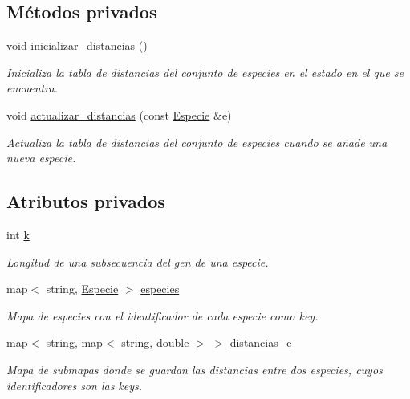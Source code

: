 \subsection*{Métodos privados}
\begin{DoxyCompactItemize}
\item 
void \hyperlink{class_cjt___especies_a8c711f5a2b07eca652b6086c28e999bc}{inicializar\+\_\+distancias} ()
\begin{DoxyCompactList}\small\item\em Inicializa la tabla de distancias del conjunto de especies en el estado en el que se encuentra. \end{DoxyCompactList}\item 
void \hyperlink{class_cjt___especies_a74dc0d7118d70ee6e24e7dd84d49e688}{actualizar\+\_\+distancias} (const \hyperlink{class_especie}{Especie} \&e)
\begin{DoxyCompactList}\small\item\em Actualiza la tabla de distancias del conjunto de especies cuando se añade una nueva especie. \end{DoxyCompactList}\end{DoxyCompactItemize}
\subsection*{Atributos privados}
\begin{DoxyCompactItemize}
\item 
int \hyperlink{class_cjt___especies_a4586fb4724b7af4b7f00bb0c0bdd6a17}{k}
\begin{DoxyCompactList}\small\item\em Longitud de una subsecuencia del gen de una especie. \end{DoxyCompactList}\item 
map$<$ string, \hyperlink{class_especie}{Especie} $>$ \hyperlink{class_cjt___especies_a8f319699bd2e8a42b85ec47b67c17563}{especies}
\begin{DoxyCompactList}\small\item\em Mapa de especies con el identificador de cada especie como key. \end{DoxyCompactList}\item 
map$<$ string, map$<$ string, double $>$ $>$ \hyperlink{class_cjt___especies_ad1c8837b7e76b9a7610b65209aa7f5e9}{distancias\+\_\+e}
\begin{DoxyCompactList}\small\item\em Mapa de submapas donde se guardan las distancias entre dos especies, cuyos identificadores son las keys. \end{DoxyCompactList}\end{DoxyCompactItemize}


